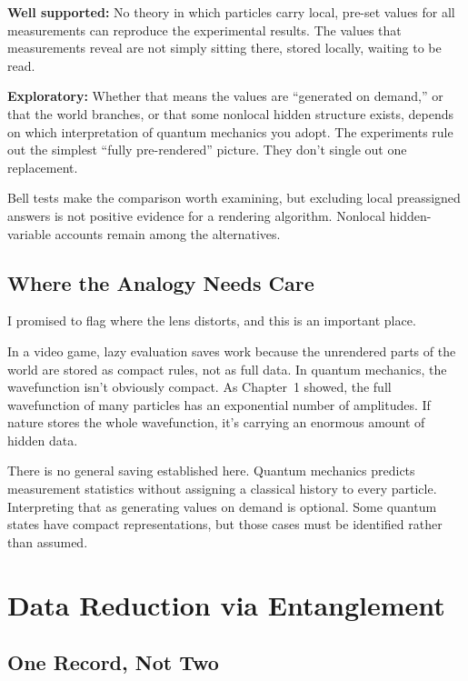 \begin{researchnotebox}
\textbf{Well supported:} No theory in which particles carry local, pre-set values for all measurements can reproduce the experimental results. The values that measurements reveal are not simply sitting there, stored locally, waiting to be read.

\textbf{Exploratory:} Whether that means the values are ``generated on demand,'' or that the world branches, or that some nonlocal hidden structure exists, depends on which interpretation of quantum mechanics you adopt. The experiments rule out the simplest ``fully pre-rendered'' picture. They don't single out one replacement.
\end{researchnotebox}

Bell tests make the comparison worth examining, but excluding local preassigned answers is not positive evidence for a rendering algorithm. Nonlocal hidden-variable accounts remain among the alternatives.

\subsection{Where the Analogy Needs Care}

I promised to flag where the lens distorts, and this is an important place.

In a video game, lazy evaluation saves work because the unrendered parts of the world are stored as compact rules, not as full data. In quantum mechanics, the wavefunction isn't obviously compact. As Chapter~1 showed, the full wavefunction of many particles has an exponential number of amplitudes. If nature stores the whole wavefunction, it's carrying an enormous amount of hidden data.

There is no general saving established here. Quantum mechanics predicts measurement statistics without assigning a classical history to every particle. Interpreting that as generating values on demand is optional. Some quantum states have compact representations, but those cases must be identified rather than assumed.

\section{Data Reduction via Entanglement}

\subsection{One Record, Not Two}

